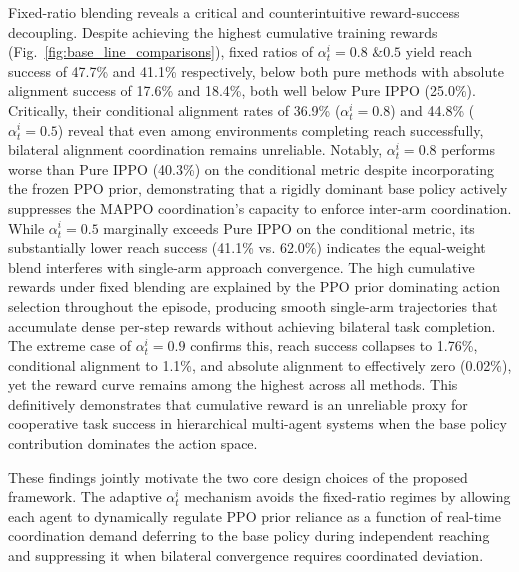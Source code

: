\documentclass[lettersize,journal]{IEEEtran}
\begin{document}
Fixed-ratio blending reveals a critical and counterintuitive reward-success decoupling. Despite achieving the highest cumulative training rewards (Fig.~\ref{fig:base_line_comparisons}), fixed ratios of $\alpha^{i}_{t}=0.8 \text{ \& }0.5$ yield reach success of 47.7\% and 41.1\% respectively, below both pure methods with absolute alignment success of 17.6\% and 18.4\%, both well below Pure IPPO (25.0\%). Critically, their conditional alignment rates of 36.9\% ($\alpha^{i}_{t}=0.8$) and 44.8\% ($\alpha^{i}_{t}=0.5$) reveal that even among environments completing reach successfully, bilateral alignment coordination remains unreliable. Notably, $\alpha^{i}_{t}=0.8$ performs worse than Pure IPPO (40.3\%) on the conditional metric despite incorporating the frozen PPO prior, demonstrating that a rigidly dominant base policy actively suppresses the MAPPO coordination's capacity to enforce inter-arm coordination. While $\alpha^{i}_{t}=0.5$ marginally exceeds Pure IPPO on the conditional metric, its substantially lower reach success (41.1\% vs. 62.0\%) indicates the equal-weight blend interferes with single-arm approach convergence. The high cumulative rewards under fixed blending are explained by the PPO prior dominating action selection throughout the episode, producing smooth single-arm trajectories that accumulate dense per-step rewards without achieving bilateral task completion. The extreme case of $\alpha^{i}_{t}=0.9$ confirms this, reach success collapses to 1.76\%, conditional alignment to 1.1\%, and absolute alignment to effectively zero (0.02\%), yet the reward curve remains among the highest across all methods. This definitively demonstrates that cumulative reward is an unreliable proxy for cooperative task success in hierarchical multi-agent systems when the base policy contribution dominates the action space.

These findings jointly motivate the two core design choices of the proposed framework. The adaptive $\alpha^{i}_{t}$ mechanism avoids the fixed-ratio regimes by allowing each agent to dynamically regulate PPO prior reliance as a function of real-time coordination demand deferring to the base policy during independent reaching and suppressing it when bilateral convergence requires coordinated deviation. 
\end{document}
